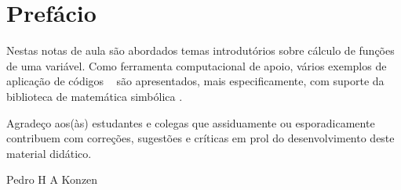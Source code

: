 
\chapter*{Prefácio}\label{prefacio}

\indent Nestas notas de aula são abordados temas introdutórios sobre cálculo de funções de uma variável. Como ferramenta computacional de apoio, vários exemplos de aplicação de códigos \python~ são apresentados, mais especificamente, com suporte da biblioteca de matemática simbólica \sympy.

\indent Agradeço aos(às) estudantes e colegas que assiduamente ou esporadicamente contribuem com correções, sugestões e críticas em prol do desenvolvimento deste material didático.

\begin{flushright}
  Pedro H A Konzen
\end{flushright}

